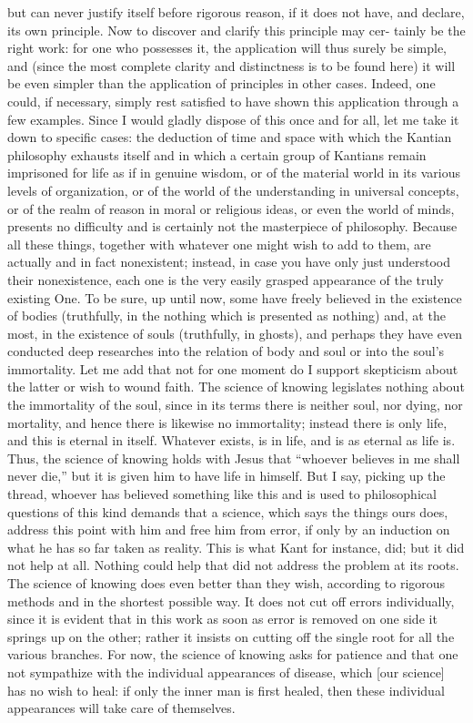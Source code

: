 but can never justify itself before rigorous reason,
if it does not have, and declare, its own principle.
Now to discover and clarify this principle may cer-
tainly be the right work:
for one who possesses it,
the application will thus surely be simple,
and (since the most complete clarity and distinctness is
to be found here)
it will be even simpler than the application
of principles in other cases.
Indeed, one could, if necessary,
simply rest satisfied to have shown
this application through a few examples.
Since I would gladly dispose of this once and for all,
let me take it down to specific cases:
the deduction of time and space
with which the Kantian philosophy exhausts itself
and in which a certain group of Kantians remain
imprisoned for life as if in genuine wisdom,
or of the material world in its various levels of organization,
or of the world of the understanding in universal concepts,
or of the realm of reason in moral or religious ideas,
or even the world of minds,
presents no difficulty and is certainly
not the masterpiece of philosophy.
Because all these things,
together with whatever one might wish to add to them,
are actually and in fact nonexistent;
instead, in case you have only just understood their nonexistence,
each one is the very easily grasped appearance
of the truly existing One.
To be sure, up until now,
some have freely believed in the existence of bodies
(truthfully, in the nothing which is presented as nothing)
and, at the most, in the existence of souls
(truthfully, in ghosts),
and perhaps they have even conducted
deep researches into the relation of body and soul
or into the soul’s immortality.
Let me add that not for one moment do I support
skepticism about the latter or wish to wound faith.
The science of knowing legislates
nothing about the immortality of the soul,
since in its terms there is
neither soul, nor dying, nor mortality,
and hence there is likewise no immortality;
instead there is only life,
and this is eternal in itself.
Whatever exists, is in life,
and is as eternal as life is.
Thus, the science of knowing holds with Jesus that
“whoever believes in me shall never die,”
but it is given him to have life in himself.
But I say, picking up the thread,
whoever has believed something like this
and is used to philosophical questions of this kind
demands that a science, which says the things ours does,
address this point with him and free him from error,
if only by an induction on what he has so far taken as reality.
This is what Kant for instance, did;
but it did not help at all.
Nothing could help that did not address the problem at its roots.
The science of knowing does even better than they wish,
according to rigorous methods and in the shortest possible way.
It does not cut off errors individually,
since it is evident that in this work
as soon as error is removed on one side
it springs up on the other;
rather it insists on cutting off
the single root for all the various branches.
For now, the science of knowing asks for patience
and that one not sympathize with
the individual appearances of disease,
which [our science] has no wish to heal:
if only the inner man is first healed,
then these individual appearances
will take care of themselves.

